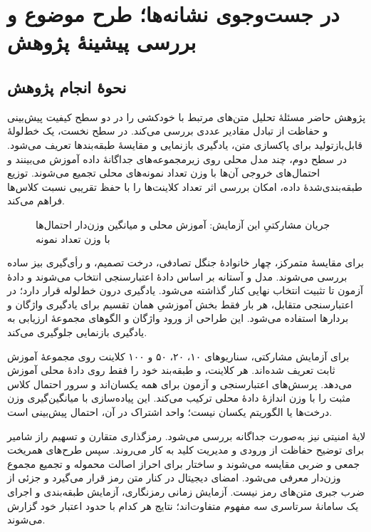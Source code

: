 \chapter{در جست‌وجوی نشانه‌ها؛ طرح موضوع و بررسی پیشینۀ پژوهش}
\label{chap:literature}

\section{نحوۀ انجام پژوهش}
پژوهش حاضر مسئلۀ تحلیل متن‌های مرتبط با خودکشی را در دو سطح کیفیت پیش‌بینی و حفاظت از تبادل مقادیر عددی بررسی می‌کند. در سطح نخست، یک خط‌لولۀ قابل‌بازتولید برای پاکسازی متن، یادگیری بازنمایی و مقایسۀ طبقه‌بندها تعریف می‌شود. در سطح دوم، چند مدل محلی روی زیرمجموعه‌های جداگانۀ داده آموزش می‌بینند و احتمال‌های خروجی آن‌ها با وزن تعداد نمونه‌های محلی تجمیع می‌شوند. توزیع طبقه‌بندی‌شدۀ داده، امکان بررسی اثر تعداد کلاینت‌ها را با حفظ تقریبی نسبت کلاس‌ها فراهم می‌کند.

\begin{figure}[htbp]
\centering

\caption{جریان مشارکتیِ این آزمایش: آموزش محلی و میانگین وزن‌دار احتمال‌ها با وزن تعداد نمونه}
\label{fig:federated-architecture}
\end{figure}

برای مقایسۀ متمرکز، چهار خانوادۀ جنگل تصادفی، درخت تصمیم،  و رأی‌گیری بیز ساده بررسی می‌شوند. مدل و آستانه بر اساس دادۀ اعتبارسنجی انتخاب می‌شوند و دادۀ آزمون تا تثبیت انتخاب نهایی کنار گذاشته می‌شود. یادگیری  درون خط‌لوله قرار دارد؛ در اعتبارسنجی متقابل، هر بار فقط بخش آموزشیِ همان تقسیم برای یادگیری واژگان و بردارها استفاده می‌شود. این طراحی از ورود واژگان و الگوهای مجموعۀ ارزیابی به یادگیری بازنمایی جلوگیری می‌کند.

برای آزمایش مشارکتی، سناریوهای ۱۰، ۲۰، ۵۰ و ۱۰۰ کلاینت روی مجموعۀ آموزش ثابت تعریف شده‌اند. هر کلاینت،  و طبقه‌بند خود را فقط روی دادۀ محلی آموزش می‌دهد. پرسش‌های اعتبارسنجی و آزمون برای همه یکسان‌اند و سرور احتمال کلاس مثبت را با وزن اندازۀ دادۀ محلی ترکیب می‌کند. این پیاده‌سازی با میانگین‌گیری وزن درخت‌ها یا الگوریتم  یکسان نیست؛ واحد اشتراک در آن، احتمال پیش‌بینی است.

لایۀ امنیتی نیز به‌صورت جداگانه بررسی می‌شود. رمزگذاری متقارن  و تسهیم راز شامیر برای توضیح حفاظت از ورودی و مدیریت کلید به کار می‌روند. سپس طرح‌های همریخت جمعی و ضربی مقایسه می‌شوند و ساختار  برای احراز اصالت محموله و تجمیع مجموع وزن‌دار معرفی می‌شود. امضای دیجیتال در کنار متن رمز قرار می‌گیرد و جزئی از ضرب جبری متن‌های رمز نیست. آزمایش زمانی رمزنگاری، آزمایش طبقه‌بندی و اجرای یک سامانۀ سرتاسری سه مفهوم متفاوت‌اند؛ نتایج هر کدام با حدود اعتبار خود گزارش می‌شوند.

